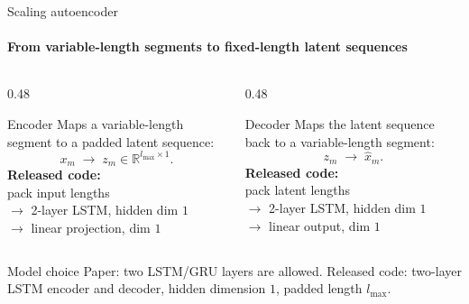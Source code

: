 \begin{frame}{Scaling autoencoder}
\framesubtitle{From variable-length segments to fixed-length latent sequences}
\begin{columns}[onlytextwidth]
\begin{column}{0.48\textwidth}
\begin{alertblock}{Encoder}
Maps a variable-length segment to a padded latent sequence:
\[
x_m \;\longrightarrow\; z_m \in \mathbb{R}^{l_{\max}\times 1}.
\]
\scriptsize\textbf{Released code:}\\
pack input lengths\\
$\to$ 2-layer LSTM, hidden dim $1$\\
$\to$ linear projection, dim $1$
\end{alertblock}
\end{column}
\begin{column}{0.48\textwidth}
\begin{alertblock}{Decoder}
Maps the latent sequence back to a variable-length segment:
\[
z_m \;\longrightarrow\; \hat{x}_m.
\]
\scriptsize\textbf{Released code:}\\
pack latent lengths\\
$\to$ 2-layer LSTM, hidden dim $1$\\
$\to$ linear output, dim $1$
\end{alertblock}
\end{column}
\end{columns}

\medskip
\begin{block}{Model choice}
\centering
\small Paper: two LSTM/GRU layers are allowed. Released code: two-layer LSTM encoder and decoder, hidden dimension $1$, padded length $l_{\max}$.
\end{block}
\end{frame}

